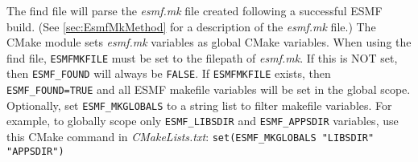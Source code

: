 The find file will parse the \textit{esmf.mk} file created following a successful
ESMF build. (See \ref{sec:EsmfMkMethod} for a description of the \textit{esmf.mk} file.)
The CMake module sets \textit{esmf.mk} variables as global CMake variables. When
using the find file, {\tt ESMFMKFILE} must be set to the filepath of \textit{esmf.mk}.
If this is NOT set, then {\tt ESMF\_FOUND} will always be {\tt FALSE}. If {\tt ESMFMKFILE}
exists, then {\tt ESMF\_FOUND=TRUE} and all ESMF makefile variables will be set
in the global scope. Optionally, set {\tt ESMF\_MKGLOBALS} to a string list to
filter makefile variables. For example, to globally scope only {\tt ESMF\_LIBSDIR}
and {\tt ESMF\_APPSDIR} variables, use this CMake command in \textit{CMakeLists.txt}: \verb|set(ESMF_MKGLOBALS "LIBSDIR" "APPSDIR")|
